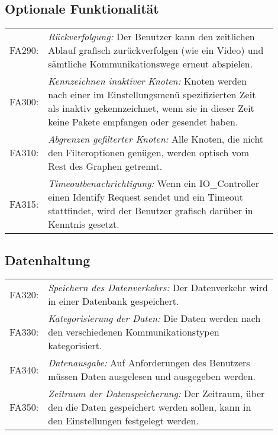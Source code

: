 \subsection{Optionale Funktionalität}
\begin{tabular}{lp{0.9\linewidth}}

FA290: & \textit{Rückverfolgung: }Der Benutzer kann den zeitlichen Ablauf grafisch zurückverfolgen (wie ein Video) und sämtliche Kommunikationswege erneut abspielen. \\

FA300: & \textit{Kennzeichnen inaktiver Knoten: }Knoten werden nach einer im Einstellungsmenü spezifizierten Zeit als inaktiv gekennzeichnet, wenn sie in dieser Zeit keine Pakete empfangen oder gesendet haben. \\

FA310: & \textit{Abgrenzen gefilterter Knoten: }Alle Knoten, die nicht den Filteroptionen genügen, werden optisch vom Rest des Graphen getrennt. \\

FA315: & \textit{Timeoutbenachrichtigung: }Wenn ein IO\_Controller einen Identify Request sendet und ein Timeout stattfindet, wird der Benutzer grafisch darüber in Kenntnis gesetzt. \\

\end{tabular}

\subsection{Datenhaltung}

\begin{tabular}{lp{0.9\linewidth}}

FA320: & \textit{Speichern des Datenverkehrs: }Der Datenverkehr wird in einer Datenbank gespeichert. \\

FA330: & \textit{Kategorisierung der Daten: }Die Daten werden nach den verschiedenen Kommunikationstypen kategorisiert. \\

FA340: & \textit{Datenausgabe: }Auf Anforderungen des Benutzers müssen Daten ausgelesen und ausgegeben werden. \\

FA350: & \textit{Zeitraum der Datenspeicherung: }Der Zeitraum, über den die Daten gespeichert werden sollen, kann in den Einstellungen festgelegt werden. \\

\end{tabular}


